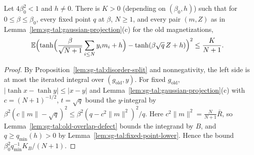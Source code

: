 \begin{theorem}
\label{thm:sg-tal:cavity-gaussian-sub}
  \leanok
{}
Let $4\beta_0^2<1$ and $h\ne0$.  There is $K>0$ (depending on $(\beta_0,h)$) such that for $0\le\beta\le\beta_0$, every fixed point $q$ at $\beta$, $N\ge1$, and every pair $(m,Z)$ as in Lemma~\ref{lem:sg-tal:gaussian-projection}(c) for the old magnetizations,
\[
\mathbb E\Bigl(\tanh\Bigl(\frac\beta{\sqrt{N+1}}\sum_{i\le N}y_im_i+h\Bigr)-\tanh(\beta\sqrt q\,Z+h)\Bigr)^2\le\frac K{N+1}.
\]
\end{theorem}
\begin{proof}
  \leanok
By Proposition~\ref{lem:sg-tal:disorder-split} and nonnegativity, the left side is at most the iterated integral over $(g_{\mathrm{old}},y)$.  For fixed $g_{\mathrm{old}}$, $|\tanh x-\tanh y|\le|x-y|$ and Lemma~\ref{lem:sg-tal:gaussian-projection}(c) with $c=(N+1)^{-1/2}$, $t=\sqrt q$ bound the $y$-integral by $\beta^2(c\|m\|-\sqrt q)^2\le\beta^2(q-c^2\|m\|^2)^2/q$.  Here $c^2\|m\|^2=\frac N{N+1}\bar R$, so Lemma~\ref{lem:sg-tal:old-overlap-defect} bounds the integrand by $B$, and $q\ge q_{\min}(h)>0$ by Lemma~\ref{lem:sg-tal:fixed-point-lower}.  Hence the bound $\beta_0^2q_{\min}^{-1}K_B/(N+1)$.
\end{proof}

